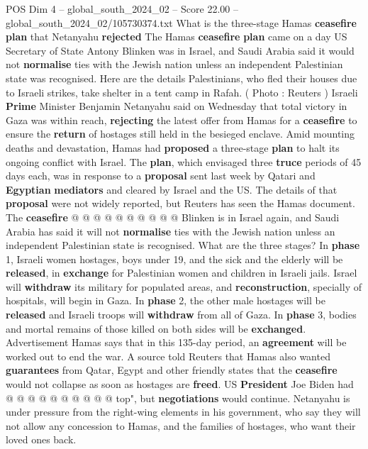 \begin{textsample}{POS Dim 4 – global\_south\_2024\_02 – Score 22.00 – global\_south\_2024\_02/105730374.txt}  \label{ex:f4_pos_075}
What is the three-stage Hamas \textbf{ceasefire} \textbf{plan} that Netanyahu \textbf{rejected} The Hamas \textbf{ceasefire} \textbf{plan} came on a day US Secretary of State Antony Blinken was in Israel, and Saudi Arabia said it would not \textbf{normalise} ties with the Jewish nation unless an independent Palestinian state was recognised.
Here are the details Palestinians, who fled their houses due to Israeli strikes, take shelter in a tent camp in Rafah. ( Photo : Reuters ) Israeli \textbf{Prime} Minister Benjamin Netanyahu said on Wednesday that total victory in Gaza was within reach, \textbf{rejecting} the latest offer from Hamas for a \textbf{ceasefire} to ensure the \textbf{return} of hostages still held in the besieged enclave.
Amid mounting deaths and devastation, Hamas had \textbf{proposed} a three-stage \textbf{plan} to halt its ongoing conflict with Israel.
The \textbf{plan}, which envisaged three \textbf{truce} periods of 45 days each, was in response to a \textbf{proposal} sent last week by Qatari and \textbf{Egyptian} \textbf{mediators} and cleared by Israel and the US.
The details of that \textbf{proposal} were not widely reported, but Reuters has seen the Hamas document.
The \textbf{ceasefire} @ @ @ @ @ @ @ @ @ @ Blinken is in Israel again, and Saudi Arabia has said it will not \textbf{normalise} ties with the Jewish nation unless an independent Palestinian state is recognised.
What are the three stages?
In \textbf{phase} 1, Israeli women hostages, boys under 19, and the sick and the elderly will be \textbf{released}, in \textbf{exchange} for Palestinian women and children in Israeli jails.
Israel will \textbf{withdraw} its military for populated areas, and \textbf{reconstruction}, specially of hospitals, will begin in Gaza.
In \textbf{phase} 2, the other male hostages will be \textbf{released} and Israeli troops will \textbf{withdraw} from all of Gaza.
In \textbf{phase} 3, bodies and mortal remains of those killed on both sides will be \textbf{exchanged}.
Advertisement Hamas says that in this 135-day period, an \textbf{agreement} will be worked out to end the war.
A source told Reuters that Hamas also wanted \textbf{guarantees} from Qatar, Egypt and other friendly states that the \textbf{ceasefire} would not collapse as soon as hostages are \textbf{freed}.
US \textbf{President} Joe Biden had @ @ @ @ @ @ @ @ @ @ top", but \textbf{negotiations} would continue.
Netanyahu is under pressure from the right-wing elements in his government, who say they will not allow any concession to Hamas, and the families of hostages, who want their loved ones back.

\end{textsample}
